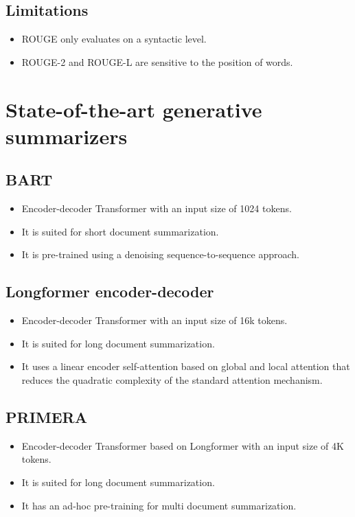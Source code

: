 \subsection{Limitations}

\begin{itemize}
    \item ROUGE only evaluates on a syntactic level.
    \item ROUGE-2 and ROUGE-L are sensitive to the position of words.
\end{itemize}



\section{State-of-the-art generative summarizers}

\subsection{BART}

\begin{itemize}
    \item {} 
        Encoder-decoder Transformer with an input size of 1024 tokens.
    \item It is suited for short document summarization.
    \item It is pre-trained using a denoising sequence-to-sequence approach.
\end{itemize}


\subsection{Longformer encoder-decoder} 

\begin{itemize}
    \item {}
        Encoder-decoder Transformer with an input size of 16k tokens.
    \item It is suited for long document summarization.
    \item It uses a linear encoder self-attention based on global and local attention that reduces the quadratic complexity of the standard attention mechanism.
\end{itemize}


\subsection{PRIMERA}

\begin{itemize}
    \item {}
        Encoder-decoder Transformer based on Longformer with an input size of 4K tokens.
    \item It is suited for long document summarization.
    \item It has an ad-hoc pre-training for multi document summarization.
\end{itemize}

